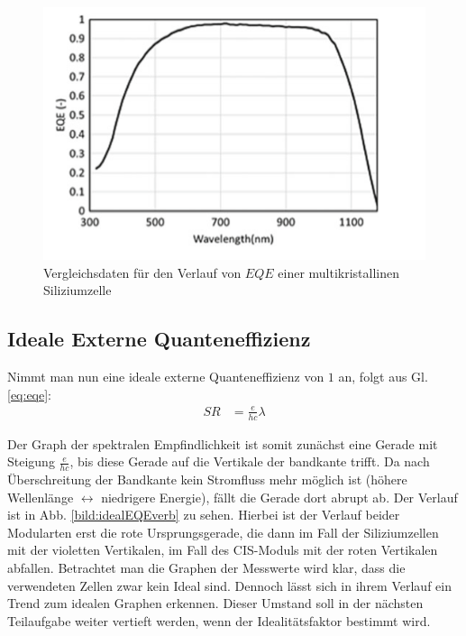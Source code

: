 
\begin{figure}[ht]
    \centering
    \includegraphics[scale=0.75]{Bilder/TheorieEQE.png}
    \caption{Vergleichsdaten für den Verlauf von $EQE$ einer multikristallinen Siliziumzelle \protect \footnotemark}
    \label{bild:ThEQE}
\end{figure}




\subsection{Ideale Externe Quanteneffizienz}

Nimmt man nun eine ideale externe Quanteneffizienz von $1$ an, folgt aus Gl. \ref{eq:eqe}:
\begin{align}
SR &= \frac{e}{hc}\lambda
\end{align}

Der Graph der spektralen Empfindlichkeit ist somit zunächst eine Gerade mit Steigung $\frac{e}{hc}$, bis diese Gerade auf die
Vertikale der bandkante trifft. Da nach Überschreitung der Bandkante kein Stromfluss mehr möglich ist (höhere Wellenlänge 
$\leftrightarrow$ niedrigere Energie), fällt die Gerade dort abrupt ab. Der Verlauf ist in Abb. \ref{bild:idealEQEverb} zu sehen.
Hierbei ist der Verlauf beider Modularten erst die rote Ursprungsgerade, die dann im Fall der Siliziumzellen mit der violetten
Vertikalen, im Fall des CIS-Moduls mit der roten Vertikalen abfallen.
Betrachtet man die Graphen der Messwerte wird klar, dass die verwendeten Zellen zwar kein Ideal sind. Dennoch lässt sich in 
ihrem Verlauf ein Trend zum idealen Graphen erkennen. Dieser Umstand soll in der
nächsten Teilaufgabe weiter vertieft werden, wenn der Idealitätsfaktor bestimmt wird.

